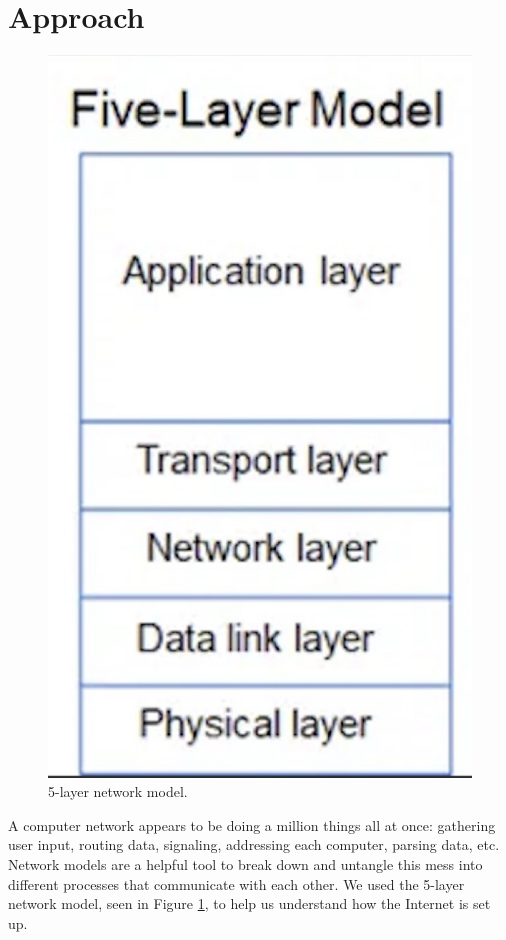 \documentclass[10pt, letterpaper, twocolumn]{article}
\begin{document}
\section{Approach}
\begin{figure}[ht]
\centering
\includegraphics[scale = 0.2]{5_layer_model.png}
\caption{5-layer network model.}
\label{fig:5-layer}
\end{figure}

A computer network appears to be doing a million things all at once: gathering user input, routing data, signaling, addressing each computer, parsing data, etc. Network models are a helpful tool to break down and untangle this mess into different processes that communicate with each other. We used the 5-layer network model, seen in Figure \ref{fig:5-layer}, to help us understand how the Internet is set up. 
\end{document}
